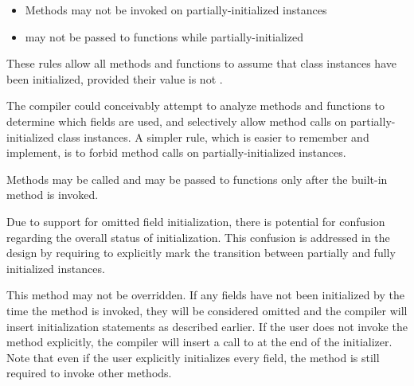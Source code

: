 \begin{itemize}
\item Methods may not be invoked on partially-initialized instances
\item {} may not be passed to functions while partially-initialized
\end{itemize}

These rules allow all methods and functions to assume that class instances
have been initialized, provided their value is not .

\begin{rationale}
  The compiler could conceivably attempt to analyze methods and functions to
  determine which fields are used, and selectively allow method calls on
  partially-initialized class instances. A simpler rule, which is easier to
  remember and implement, is to forbid method calls on partially-initialized
  instances.
\end{rationale}

Methods may be called and  may be passed to functions only after the
built-in  method is invoked.

\begin{rationale}
Due to support for omitted field initialization, there is potential for
confusion regarding the overall status of initialization. This confusion is
addressed in the design by requiring  to explicitly mark the
transition between partially and fully initialized instances.
\end{rationale}

This method may not be overridden. If any fields have not been initialized by
the time the  method is invoked, they will be considered omitted
and the compiler will insert initialization statements as described earlier. If
the user does not invoke the  method explicitly, the compiler
will insert a call to  at the end of the initializer. Note that
even if the user explicitly initializes every field, the  method
is still required to invoke other methods.

